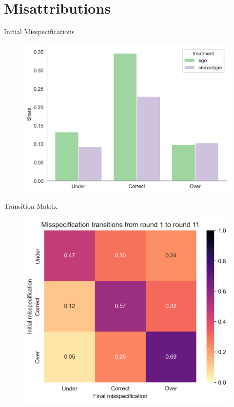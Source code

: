 \documentclass[aspectratio=169]{beamer}
\begin{document}
\section*{Misattributions}

\begin{frame}{Initial Misspecifications}
    \label{initialhist}
    \begin{figure}
        \centering
        \includegraphics[scale=.6]{misspecification_hist.png}
    \end{figure}

\end{frame}

\begin{frame}{Transition Matrix}
    \begin{figure}
        \centering
        \includegraphics[scale=.6]{misspecification_transitions.png}
    \end{figure}
    \label{transition}
\end{frame}
\end{document}
